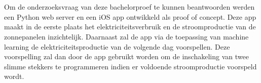 
\chapter{}%
\label{ch:proofofconcept}


\section{}%
\label{sec:ontwikkeling mobiele app}

Om de onderzoeksvraag van deze bachelorproef te kunnen beantwoorden werden een Python web server en een  iOS app ontwikkeld als proof of concept. Deze app maakt in de eerste plaats het elektriciteitsverbruik en de stroomproductie van de zonnepanelen inzichtelijk. Daarnaast zal de app via de toepassing van machine learning de elektriciteitsproductie van de volgende dag voorspellen. Deze voorspelling zal dan door de app gebruikt worden om de inschakeling van twee slimme stekkers te programmeren indien er voldoende stroomproductie voorspeld wordt.

\subsection{}%
\label{sec:Digitale elektriciteitsmeter uitlezen}

